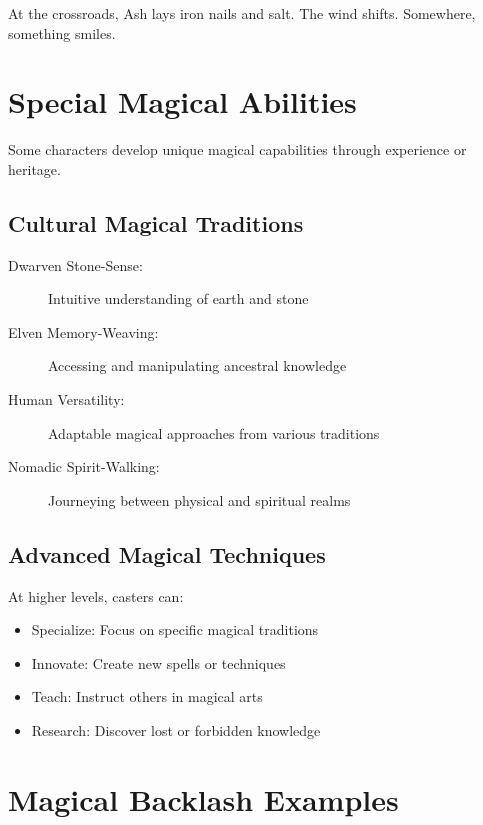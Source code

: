 \documentclass[11pt,twoside,openany]{book}
\begin{document}
\begin{tcolorbox}[colback=gray!5!white, colframe=gray!75!black, title=Vignette, fonttitle=\bfseries]
At the crossroads, Ash lays iron nails and salt. The wind shifts. Somewhere, something smiles.
\end{tcolorbox}

\section*{Special Magical Abilities} 

Some characters develop unique magical capabilities through experience or heritage.

\subsection*{Cultural Magical Traditions}

\begin{description}
\item[Dwarven Stone-Sense:] Intuitive understanding of earth and stone
\item[Elven Memory-Weaving:] Accessing and manipulating ancestral knowledge
\item[Human Versatility:] Adaptable magical approaches from various traditions
\item[Nomadic Spirit-Walking:] Journeying between physical and spiritual realms
\end{description}

\subsection*{Advanced Magical Techniques}

At higher levels, casters can:
\begin{itemize}
\item Specialize: Focus on specific magical traditions
\item Innovate: Create new spells or techniques
\item Teach: Instruct others in magical arts
\item Research: Discover lost or forbidden knowledge
\end{itemize}

\section*{Magical Backlash Examples} 
\end{document}
